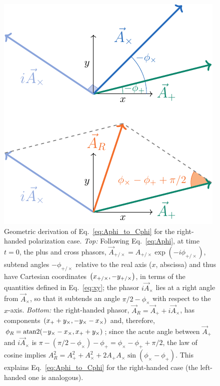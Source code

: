 \documentclass[aps,prd,twocolumn,superscriptaddress,preprintnumbers,floatfix,nofootinbib]{revtex4-2}
\begin{document}
\begin{figure}
\includegraphics[width=0.8\columnwidth]{diagram_apac}
\caption{Geometric derivation of Eq.~\eqref{eq:Aphi_to_Cphi} for the right-handed polarization case.
\emph{Top:} Following Eq.~\eqref{eq:Aphi}, at time $t=0$, the plus and cross phasors, $\vec{A}_{+/\times} = A_{+/\times} \exp(-i \phi_{+/\times})$, subtend angles $-\phi_{+/\times}$ relative to the real axis ($x$, abscissa) and thus have Cartesian coordinates $\left(x_{+/\times}, - y_{+/\times} \right)$, in terms of the quantities defined in Eq.~\eqref{eq:xy}; the phasor $i\vec{A}_\times$ lies at a right angle from $\vec{A}_\times$, so that it subtends an angle $\pi/2 - \phi_\times$ with respect to the $x$-axis.
\emph{Bottom:} the right-handed phasor, $\vec{A}_R = \vec{A}_+ + i \vec{A}_\times$, has components $\left(x_{+} + y_{\times}, -y_{\times} - x_{\times}\right)$ and, therefore, $\phi_R = \mathrm{atan2}( -y_{\times} - x_{\times}, x_{+} + y_{\times})$; since the acute angle between $\vec{A}_+$ and $i\vec{A}_\times$ is $\pi - (\pi /2 - \phi_\times) - \phi_+ = \phi_\times - \phi_+ + \pi/2$, the law of cosine implies $A_R^2 = A_+^2 + A_\times^2 + 2 A_+ A_\times \sin(\phi_\times - \phi_+)$.
This explains Eq.~\eqref{eq:Aphi_to_Cphi} for the right-handed case (the left-handed one is analogous).
}
\label{fig:diag_apac}
\end{figure}
\end{document}
